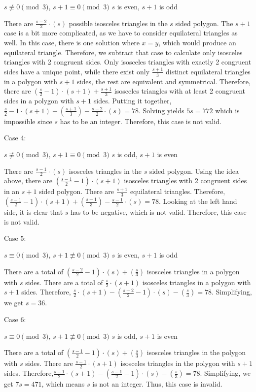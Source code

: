\begin{enumerate}
 $s\not\equiv 0\pmod{3}$, $s+1\equiv 0\pmod{3}$
$s$ is even, $s+1$ is odd

 There are $\frac{s-2}{2}\cdot{(s)}$ possible isosceles triangles in the $s$ sided polygon. The $s+1$ case is a bit more complicated, as we have to consider equilateral triangles as well. In this case, there is one solution where $x=y$, which would produce an equilateral triangle. Therefore, we subtract that case to calculate only isosceles triangles with 2 congruent sides. Only isosceles triangles with exactly 2 congruent sides have a unique point, while there exist only $\frac{s+1}{3}$ distinct equilateral triangles in a polygon with $s+1$ sides, the rest are equivalent and symmetrical. Therefore, there are $(\frac{s}{2}-1)\cdot{(s+1)}+\frac{s+1}{3}$ isosceles triangles with at least 2 congruent sides in a polygon with $s+1$ sides. Putting it together, $\frac{s}{2}-1\cdot{(s+1)}+(\frac{s+1}{3})-\frac{s-2}{2}\cdot{(s)}=78$. Solving yields $5s=772$ which is impossible since $s$ has to be an integer. Therefore, this case is not valid.

 Case 4:

 $s\not\equiv 0\pmod{3}$, $s+1\equiv 0\pmod{3}$
$s$ is odd, $s+1$ is even

 There are  $\frac{s-1}{2}\cdot{(s)}$ isosceles triangles in the $s$ sided polygon. Using the idea above, there are $(\frac{s-1}{2}-1)\cdot{(s+1)}$ isosceles triangles with 2 congruent sides in an $s+1$ sided polygon. There are $\frac{s+1}{3}$ equilateral triangles. Therefore,  $(\frac{s-1}{2}-1)\cdot{(s+1)}+(\frac{s+1}{3})-\frac{s-1}{2}\cdot{(s)}=78$. Looking at the left hand side, it is clear that $s$ has to be negative, which is not valid. Therefore, this case is not valid.

 Case 5:

 $s\equiv 0\pmod{3}$, $s+1\not\equiv 0\pmod{3}$
$s$ is even, $s+1$ is odd

 There are a total of $(\frac{s-2}{2}-1)\cdot{(s)}+(\frac{s}{3})$ isosceles triangles in a polygon with $s$ sides. There are a total of $\frac{s}{2}\cdot{(s+1)}$ isosceles triangles in a polygon with $s+1$ sides. Therefore, $\frac{s}{2}\cdot{(s+1)}-(\frac{s-2}{2}-1)\cdot{(s)}-(\frac{s}{3})=78$. Simplifying, we get $s=36$.

 Case 6:

 $s\equiv 0\pmod{3}$, $s+1\not\equiv 0\pmod{3}$
$s$ is odd, $s+1$ is even

 There are a total of $(\frac{s-1}{2}-1)\cdot{(s)}+(\frac{s}{3})$ isosceles triangles in the polygon with $s$ sides. There are $\frac{s-1}{2}\cdot{(s+1)}$ isosceles triangles in the polygon with $s+1$ sides. Therefore,$\frac{s-1}{2}\cdot{(s+1)}-(\frac{s-1}{2}-1)\cdot{(s)}-(\frac{s}{3})=78$. Simplifying, we get $7s=471$, which means $s$ is not an integer. Thus, this case is invalid.


\end{enumerate}
